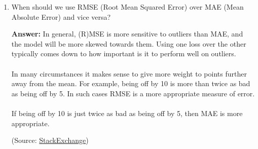 \documentclass{article}
\newenvironment{QandA}{\begin{enumerate}[label=\arabic*.]}{\end{enumerate}}
\newenvironment{answer}{\par\normalfont \textbf{Answer:}}{}
\begin{document}
\begin{QandA}
    \item When should we use RMSE (Root Mean Squared Error) over MAE (Mean Absolute Error) and vice versa?
    \begin{answer}
        In general, (R)MSE is more sensitive to outliers than MAE, and the model will be more skewed towards them. Using one loss over the other typically comes down to how important is it to perform well on outliers.\\\\
         In many circumstances it makes sense to give more weight to points further away from the mean. For example, being off by 10 is more than twice as bad as being off by 5. In such cases RMSE is a more appropriate measure of error. \\\\
         If being off by 10 is just twice as bad as being off by 5, then MAE is more appropriate.

         (Source: \href{https://stats.stackexchange.com/questions/48267/mean-absolute-error-or-root-mean-squared-error}{StackExchange})
    \end{answer}


\end{QandA}
\end{document}
